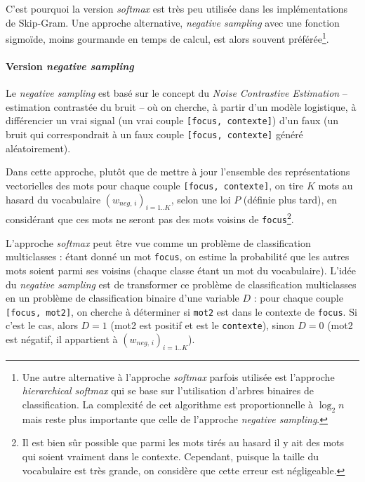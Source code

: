 \documentclass[11pt,french,french]{article}
\let\rmarkdownfootnote\footnote%
\def\footnote{\protect\rmarkdownfootnote}
\begin{document}
C'est pourquoi la version \emph{softmax} est très peu utilisée dans les
implémentations de Skip-Gram. Une approche alternative, \emph{negative
sampling} avec une fonction sigmoïde, moins gourmande en temps de
calcul, est alors souvent préférée\footnote{Une autre alternative à
  l'approche \emph{softmax} parfois utilisée est l'approche
  \emph{hierarchical softmax} qui se base sur l'utilisation d'arbres
  binaires de classification. La complexité de cet algorithme est
  proportionnelle à \(\log_2n\) mais reste plus importante que celle de
  l'approche \emph{negative sampling}.}.

\paragraph{\texorpdfstring{Version \emph{negative
sampling}}{Version negative sampling}}\label{subsec:negsampling}

Le \emph{negative sampling} est basé sur le concept du \emph{Noise
Contrastive Estimation} -- estimation contrastée du bruit -- où on
cherche, à partir d'un modèle logistique, à différencier un vrai signal
(un vrai couple \texttt{{[}focus,\ contexte{]}}) d'un faux (un bruit qui
correspondrait à un faux couple \texttt{{[}focus,\ contexte{]}} généré
aléatoirement).

Dans cette approche, plutôt que de mettre à jour l'ensemble des
représentations vectorielles des mots pour chaque couple
\texttt{{[}focus,\ contexte{]}}, on tire \(K\) mots au hasard du
vocabulaire \((w_{neg,\,i})_{i=1..K}\), selon une loi \(P\) (définie
plus tard), en considérant que ces mots ne seront pas des mots voisins
de \texttt{focus}\footnote{Il est bien sûr possible que parmi les mots
  tirés au hasard il y ait des mots qui soient vraiment dans le
  contexte. Cependant, puisque la taille du vocabulaire est très grande,
  on considère que cette erreur est négligeable.}.

L'approche \emph{softmax} peut être vue comme un problème de
classification multiclasses : étant donné un mot \texttt{focus}, on
estime la probabilité que les autres mots soient parmi ses voisins
(chaque classe étant un mot du vocabulaire). L'idée du \emph{negative
sampling} est de transformer ce problème de classification multiclasses
en un problème de classification binaire d'une variable \(D\) : pour
chaque couple \texttt{{[}focus,\ mot2{]}}, on cherche à déterminer si
\texttt{mot2} est dans le contexte de \texttt{focus}. Si c'est le cas,
alors \(D=1\) (mot2 est positif et est le \texttt{contexte}), sinon
\(D=0\) (mot2 est négatif, il appartient à \((w_{neg,\,i})_{i=1..K}\)).
\end{document}
